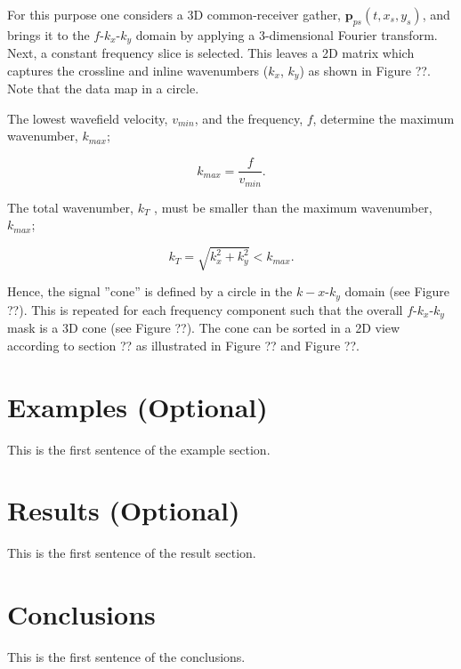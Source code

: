\documentclass{madrid15WS}
\begin{document}
For this purpose one considers a 3D common-receiver gather, $\mathbf{p}_{ps}(t, x_s, y_s)$, and brings it to the $f$-$k_x$-$k_y$ domain by applying a 3-dimensional Fourier transform. Next, a constant frequency slice is selected. This leaves a 2D matrix which captures the crossline and inline wavenumbers ($k_x$, $k_y$) as shown in Figure ??. Note that the data map in a circle.

The lowest wavefield velocity, $v_{min}$, and the frequency, $f$, determine the maximum wavenumber, $k_{max}$;

\begin{equation}
	k_{max} = \frac{f}{v_{min}}.
	\label{eq:kmax}
\end{equation}

The total wavenumber, $k_T$ , must be smaller than the maximum wavenumber, $k_{max}$; 

\begin{equation}
	k_{T} = \sqrt{k_x^2 + k_y^2} < k_{max}.
	\label{eq:kT}
\end{equation}

Hence, the signal ”cone” is defined by a circle in the $k-x$-$k_y$ domain (see Figure ??). This is repeated for each frequency component such that the overall $f$-$k_x$-$k_y$ mask is a 3D cone (see Figure ??). The cone can be sorted in a 2D view according to section ?? as illustrated in Figure ?? and Figure ??.


\section{Examples (Optional)}

This is the first sentence of the example section.

\section{Results (Optional)}

This is the first sentence of the result section.


\section{Conclusions}

This is the first sentence of the conclusions.
\end{document}
